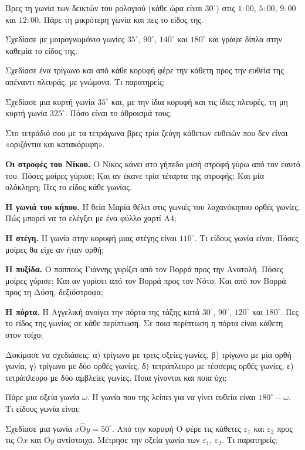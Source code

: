 \ex Βρες τη γωνία των δεικτών του ρολογιού (κάθε ώρα είναι $30^\circ$) στις $1{:}00$, $5{:}00$, $9{:}00$ και $12{:}00$. Πάρε τη μικρότερη γωνία και πες το είδος της.

\ex Σχεδίασε με μοιρογνωμόνιο γωνίες $35^\circ$, $90^\circ$, $140^\circ$ και $180^\circ$ και γράψε δίπλα στην καθεμία το είδος της.

\ex Σχεδίασε ένα τρίγωνο και από κάθε κορυφή φέρε την κάθετη προς την ευθεία της απέναντι πλευράς, με γνώμονα. Τι παρατηρείς;

\ex Σχεδίασε μια κυρτή γωνία $35^\circ$ και, με την ίδια κορυφή και τις ίδιες πλευρές, τη μη κυρτή γωνία $325^\circ$. Πόσο είναι το άθροισμά τους;

\ex Στο τετράδιό σου με τα τετράγωνα βρες τρία ζεύγη κάθετων ευθειών που δεν είναι «οριζόντια και κατακόρυφη».


\ex \textbf{Οι στροφές του Νίκου.} Ο Νίκος κάνει στο γήπεδο μισή στροφή γύρω από τον εαυτό του. Πόσες μοίρες γύρισε; Και αν έκανε τρία τέταρτα της στροφής; Και μία ολόκληρη; Πες το είδος κάθε γωνίας.

\ex \textbf{Η γωνιά του κήπου.} Η θεία Μαρία θέλει στις γωνιές του λαχανόκηπου ορθές γωνίες. Πώς μπορεί να το ελέγξει με ένα φύλλο χαρτί Α4;

\ex \textbf{Η στέγη.} Η γωνία στην κορυφή μιας στέγης είναι $110^\circ$. Τι είδους γωνία είναι; Πόσες μοίρες θα είχε αν ήταν ορθή;

\ex \textbf{Η πυξίδα.} Ο παππούς Γιάννης γυρίζει από τον Βορρά προς την Ανατολή. Πόσες μοίρες γύρισε; Και αν γυρίσει από τον Βορρά προς τον Νότο; Και από τον Βορρά προς τη Δύση, δεξιόστροφα;

\ex \textbf{Η πόρτα.} Η Αγγελική ανοίγει την πόρτα της τάξης κατά $30^\circ$, $90^\circ$, $120^\circ$ και $180^\circ$. Πες το είδος της γωνίας σε κάθε περίπτωση. Σε ποια περίπτωση η πόρτα είναι κάθετη στον τοίχο;


\ex Δοκίμασε να σχεδιάσεις: α) τρίγωνο με τρεις οξείες γωνίες, β) τρίγωνο με μία ορθή γωνία, γ) τρίγωνο με δύο ορθές γωνίες, δ) τετράπλευρο με τέσσερις ορθές γωνίες, ε) τετράπλευρο με δύο αμβλείες γωνίες. Ποια γίνονται και ποια όχι;

\ex Πάρε μια οξεία γωνία $\omega$. Η γωνία που της λείπει για να γίνει ευθεία είναι $180^\circ-\omega$. Τι είδους γωνία είναι;

\ex Σχεδίασε μια γωνία $x\hat{\mathrm{Ο}}y=50^\circ$. Από την κορυφή $\mathrm{Ο}$ φέρε τις κάθετες $\varepsilon_1$ και $\varepsilon_2$ προς τις $\mathrm{Ο}x$ και $\mathrm{Ο}y$ αντίστοιχα. Μέτρησε την οξεία γωνία των $\varepsilon_1$, $\varepsilon_2$. Τι παρατηρείς;


